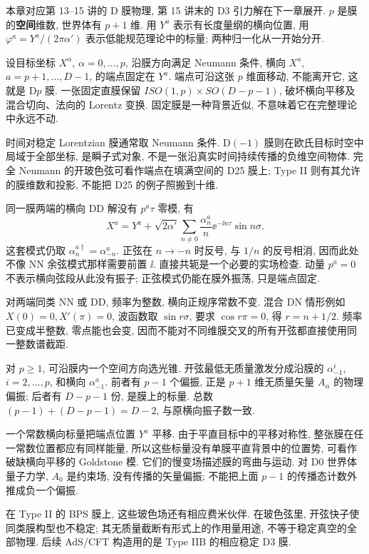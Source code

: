 本章对应第 13--15 讲的 D 膜物理, 第 15 讲末的 D3 引力解在下一章展开. $p$ 是膜的\textbf{空间}维数, 世界体有 $p+1$ 维. 用 $Y^a$ 表示有长度量纲的横向位置, 用 $\varphi^a=Y^a/(2\pi\alpha')$ 表示低能规范理论中的标量; 两种归一化从一开始分开.

设目标坐标 $X^\alpha$, $\alpha=0,\ldots,p$, 沿膜方向满足 Neumann 条件, 横向 $X^a$, $a=p+1,\ldots,D-1$, 的端点固定在 $Y^a$. 端点可沿这张 $p$ 维面移动, 不能离开它, 这就是 D$p$ 膜. 一张固定直膜保留 $ISO(1,p)\times SO(D-p-1)$, 破坏横向平移及混合切向、法向的 Lorentz 变换. 固定膜是一种背景近似, 不意味着它在完整理论中永远不动.

时间对稳定 Lorentzian 膜通常取 Neumann 条件. D$(-1)$ 膜则在欧氏目标时空中局域于全部坐标, 是瞬子式对象, 不是一张沿真实时间持续传播的负维空间物体. 完全 Neumann 的开玻色弦可看作端点在填满空间的 D25 膜上; Type II 则有其允许的膜维数和投影, 不能把 D25 的例子照搬到十维.

同一膜两端的横向 DD 解没有 $p^a\tau$ 零模, 有
\[
X^a=Y^a+\sqrt{2\alpha'}\sum_{n\ne0}
\frac{\alpha_n^a}{n}\ee^{-\ii n\tau}\sin n\sigma.
\]
这套模式仍取 $\alpha_n^{a\dagger}=\alpha_{-n}^a$. 正弦在 $n\to-n$ 时反号, 与 $1/n$ 的反号相消, 因而此处不像 NN 余弦模式那样需要前置 $\ii$. 直接共轭是一个必要的实场检查. 动量 $p^a=0$ 不表示横向弦段从此没有振子; 正弦模式仍能在膜外振荡, 只是端点固定.

对两端同类 NN 或 DD, 频率为整数, 横向正规序常数不变. 混合 DN 情形例如 $X(0)=0,X'(\pi)=0$, 波函数取 $\sin r\sigma$, 要求 $\cos r\pi=0$, 得 $r=n+1/2$. 频率已变成半整数, 零点能也会变, 因而不能对不同维膜交叉的所有开弦都直接使用同一整数谱截距.

对 $p\ge1$, 可沿膜内一个空间方向选光锥. 开弦最低无质量激发分成沿膜的 $\alpha_{-1}^i$, $i=2,\ldots,p$, 和横向 $\alpha_{-1}^a$. 前者有 $p-1$ 个偏振, 正是 $p+1$ 维无质量矢量 $A_\alpha$ 的物理偏振; 后者有 $D-p-1$ 份, 是膜上的标量. 总数 $(p-1)+(D-p-1)=D-2$, 与原横向振子数一致.

一个常数横向标量把端点位置 $Y^a$ 平移. 由于平直目标中的平移对称性, 整张膜在任一常数位置都应有同样能量, 所以这些标量没有单膜平直背景中的位置势, 可看作破缺横向平移的 Goldstone 模. 它们的慢变场描述膜的弯曲与运动. 对 D0 世界体量子力学, $A_0$ 是约束场, 没有传播的矢量偏振; 不能把上面 $p-1$ 的传播态计数外推成负一个偏振.

在 Type II 的 BPS 膜上, 这些玻色场还有相应费米伙伴. 在玻色弦里, 开弦快子使同类膜构型也不稳定; 其无质量截断有形式上的作用量用途, 不等于稳定真空的全部物理. 后续 AdS/CFT 构造用的是 Type IIB 的相应稳定 D3 膜.

